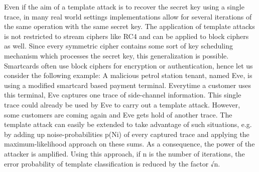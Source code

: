     Even if the aim of a template attack is to recover the secret key using a
    single trace, in many real world settings implementations allow for several
    iterations of the same operation with the same secret key. The application
    of template attacks is not restricted to stream ciphers like RC4 and can be
    applied to block ciphers as well. Since every symmetric cipher contains some
    sort of key scheduling mechanism which processes the secret key, this
    generalization is possible. Smartcards often use block ciphers for
    encryption or authentication, hence let us consider the following example: A
    malicious petrol station tenant, named Eve, is using a modified smartcard
    based payment terminal. Everytime a customer uses this terminal, Eve
    captures one trace of side-channel information. This single trace could
    already be used by Eve to carry out a template attack. However, some
    customers are coming again and Eve gets hold of another trace. The template
    attack can easily be extended to take advantage of such situations, e.g. by
    adding up noise-probabilities p(Ni) of every captured trace and applying the
    maximum-likelihood approach on these sums. As a consequence, the power of
    the attacker is amplified. Using this approach, if n is the number of
    iterations, the error probability of template classification is reduced by
    the factor √n. 

